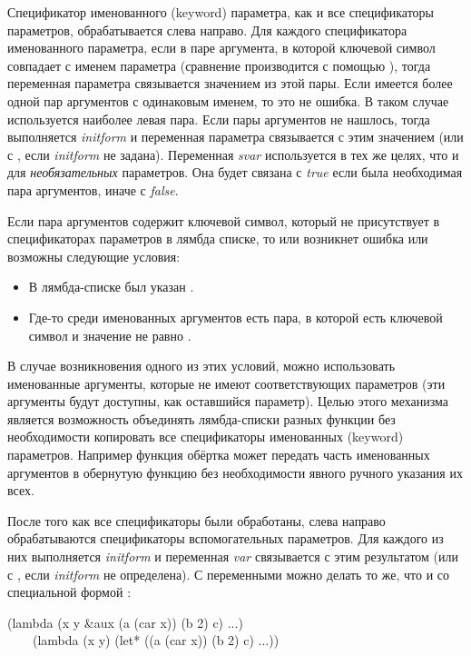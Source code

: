 Спецификатор именованного (keyword) параметра, как и все спецификаторы
параметров, обрабатывается слева направо.
Для каждого спецификатора именованного параметра, если в паре аргумента, в
которой ключевой символ совпадает с именем параметра (сравнение производится с
помощью ), тогда переменная параметра связывается значением из этой
пары.
Если имеется более одной пар аргументов с одинаковым именем, то это не ошибка. В
таком случае используется наиболее левая пара.
Если пары аргументов не нашлось, тогда выполняется \emph{initform} и
переменная параметра связывается с этим значением (или с {\false}, если
\emph{initform} не задана). Переменная \emph{svar} используется в тех же
целях, что и для \emph{необязательных} параметров. Она будет связана с
\emph{true} если была необходимая пара аргументов, иначе с \emph{false}.

Если пара аргументов содержит ключевой символ, который не
присутствует в спецификаторах параметров в лямбда списке, то или возникнет
ошибка или возможны следующие условия:
\begin{itemize}
\item
В лямбда-списке был указан .

\item
Где-то среди именованных аргументов есть пара, в которой есть ключевой символ
 и значение не равно {\false}.
\end{itemize}

В случае возникновения одного из этих условий, можно использовать именованные
аргументы, которые не имеют соответствующих параметров (эти аргументы будут
доступны, как оставшийся  параметр). 
Целью этого механизма является возможность объединять лямбда-списки разных
функции без необходимости копировать все спецификаторы именованных (keyword)
параметров. Например функция обёртка может передать часть именованных аргументов
в обернутую функцию без необходимости явного ручного указания их всех. 

После того как все спецификаторы были обработаны, слева направо обрабатываются
спецификаторы вспомогательных параметров. Для каждого из них выполняется
\emph{initform} и переменная \emph{var} связывается с этим результатом (или
с {\false}, если \emph{initform} не определена). С  переменными
можно делать то же, что и со специальной формой :
\begin{lisp}
(lambda (x y \&aux (a (car x)) (b 2) c) ...) \\
~~~\EQ\ (lambda (x y) (let* ((a (car x)) (b 2) c) ...))
\end{lisp}

